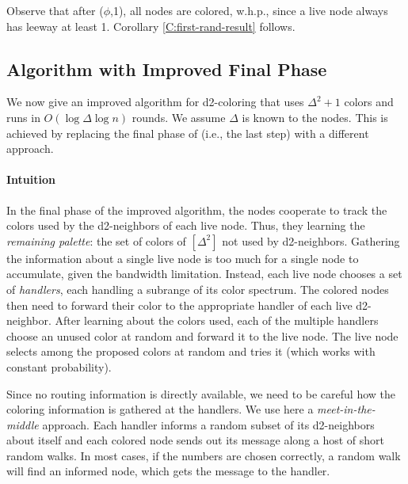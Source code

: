 Observe that after ($\phi$,1), all nodes are colored, w.h.p., since a live node always has leeway at least 1. 
Corollary \ref{C:first-rand-result} follows.


\subsection{Algorithm with Improved Final Phase}

We now give an improved algorithm for d2-coloring that uses $\Delta^2+1$ colors and runs in $O(\log \Delta\log n)$ rounds. We assume $\Delta$ is known to the nodes.
This is achieved by replacing the final phase of  (i.e., the last step) with a different approach.

\paragraph*{Intuition}
In the final phase of the improved algorithm, the nodes cooperate to track the colors used by the d2-neighbors of each live node. Thus, they learning the \emph{remaining palette}: the set of colors of $[\Delta^2]$ not used by d2-neighbors. Gathering the information about a single live node is too much for a single node to accumulate, given the bandwidth limitation. Instead, each live node chooses a set of \emph{handlers}, each handling a subrange of its color spectrum. The colored nodes then need to forward their color to the appropriate handler of each live d2-neighbor. After learning about the colors used, each of the multiple handlers choose an unused color at random and forward it to the live node. The live node selects among the proposed colors at random and tries it (which works with constant probability).

Since no routing information is directly available, we need to be careful how the coloring information is gathered at the handlers. We use here a \emph{meet-in-the-middle} approach. Each handler informs a random subset of its d2-neighbors about itself and each colored node sends out its message along a host of short random walks. In most cases, if the numbers are chosen correctly, a random walk will find an informed node, which gets the message to the handler. 

